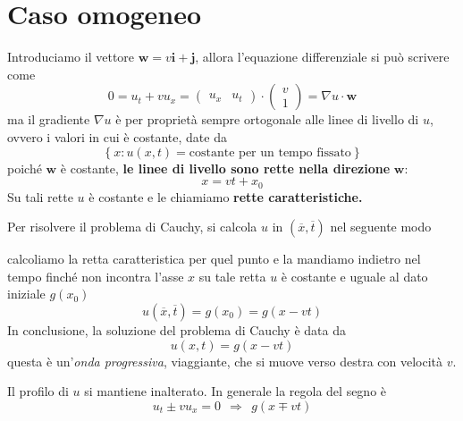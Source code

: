 \documentclass[10pt,a4paper,twoside,openright]{book}
\begin{document}
\section{Caso omogeneo}

Introduciamo il vettore $\mathbf{w} =v\mathbf{i} +\mathbf{j}$, allora l'equazione differenziale si può scrivere come
\begin{equation*}
    0=u_{t} +vu_{x} =
    \begin{pmatrix}
        u_{x} & u_{t}
    \end{pmatrix} \cdotp \begin{pmatrix}
        v \\
        1
    \end{pmatrix} =\nabla u\cdotp \mathbf{w}
\end{equation*}
ma il gradiente $\nabla u$ è per proprietà sempre ortogonale alle linee di livello di $u$, ovvero i valori in cui è costante, date da
\begin{equation*}
    \left\{x:u(x,t) =\text{costante per un tempo fissato}\right\}
\end{equation*}
poiché $\mathbf{w}$ è costante, \textbf{le linee di livello sono rette nella direzione} $\mathbf{w}$:
\begin{equation}
    x=vt+x_{0}
\end{equation}
Su tali rette $u$ è costante e le chiamiamo \textbf{rette caratteristiche.}

Per risolvere il problema di Cauchy, si calcola $u$ in $(\overline{x} ,\overline{t})$ nel seguente modo


calcoliamo la retta caratteristica per quel punto e la mandiamo indietro nel tempo finché non incontra l'asse $x$ su tale retta $u$ è costante e uguale al dato iniziale $g(x_{0})$
\begin{equation*}
    u(\overline{x} ,\overline{t}) =g(x_{0}) =g(x-vt)
\end{equation*}
In conclusione, la soluzione del problema di Cauchy è data da
\begin{equation}
    u(x,t) =g(x-vt)
\end{equation}
questa è un'\textit{onda progressiva}, viaggiante, che si muove verso destra con velocità $v$.


Il profilo di $u$ si mantiene inalterato. In generale la regola del segno è
\begin{equation*}
    u_{t} \pm vu_{x} =0\ \ \Rightarrow \ \ g(x\mp vt)
\end{equation*}
\end{document}
